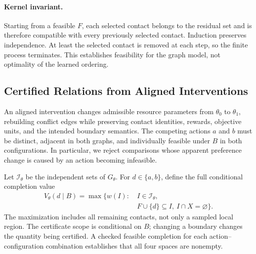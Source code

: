 \paragraph{Kernel invariant.}
Starting from a feasible $F$, each selected contact belongs to the residual
set and is therefore compatible with every previously selected contact.
Induction preserves independence. At least the selected contact is removed
at each step, so the finite process terminates. This establishes feasibility
for the graph model, not optimality of the learned ordering.

\subsection{Certified Relations from Aligned Interventions}
\label{sec:method:evidence}

An aligned intervention changes admissible resource parameters from
$\theta_0$ to $\theta_1$, rebuilding conflict edges while preserving contact
identities, rewards, objective units, and the intended boundary semantics.
The competing actions $a$ and $b$ must be distinct, adjacent in both graphs,
and individually feasible under $B$ in both configurations. In particular,
we reject comparisons whose apparent preference change is caused by an
action becoming infeasible.

Let $\mathcal{I}_\theta$ be the independent sets of $G_\theta$.
For $d\in\{a,b\}$, define the full conditional completion value
\begin{equation}
 \begin{split}
 V_\theta(d\mid B)=\max\{w(I):\ &I\in\mathcal{I}_\theta,\\
 &F\cup\{d\}\subseteq I,\ I\cap X=\varnothing\}.
 \end{split}
 \label{eq:method:conditional}
\end{equation}
The maximization includes all remaining contacts, not only a sampled local
region. The certificate scope is conditional on $B$; changing a boundary
changes the quantity being certified. A checked feasible completion for
each action--configuration combination establishes that all four spaces
are nonempty.

